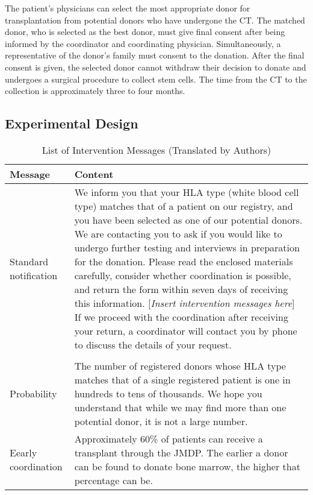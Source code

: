 \documentclass[12pt, a4paper]{article}
\begin{document}
The patient's physicians can select the most appropriate donor for transplantation from potential donors who have undergone the CT. The matched donor, who is selected as the best donor, must give final consent after being informed by the coordinator and coordinating physician. Simultaneously, a representative of the donor's family must consent to the donation. After the final consent is given, the selected donor cannot withdraw their decision to donate and undergoes a surgical procedure to collect stem cells. The time from the CT to the collection is approximately three to four months.

\hypertarget{design}{%
\subsection{Experimental Design}\label{design}}

\begin{table}

\caption{\label{tab:list-message}List of Intervention Messages (Translated by Authors)}
\centering
\fontsize{8}{10}\selectfont
\begin{tabular}[t]{l>{\raggedright\arraybackslash}p{40em}}
\toprule
Message & Content\\
\midrule
Standard notification & We inform you that your HLA type (white blood cell type) matches that of a patient on our registry, and you have been selected as one of our potential donors. We are contacting you to ask if you would like to undergo further testing and interviews in preparation for the donation. Please read the enclosed materials carefully, consider whether coordination is possible, and return the form within seven days of receiving this information. [\emph{Insert intervention messages here}] If we proceed with the coordination after receiving your return, a coordinator will contact you by phone to discuss the details of your request.\\
\addlinespace[0.3em]
\multicolumn{2}{l}{\textbf{Intervention message}}\\
\hspace{1em}Probability & The number of registered donors whose HLA type matches that of a single registered patient is one in hundreds to tens of thousands. We hope you understand that while we may find more than one potential donor, it is not a large number.\\
\hspace{1em}Eearly coordination & Approximately 60\% of patients can receive a transplant through the JMDP. The earlier a donor can be found to donate bone marrow, the higher that percentage can be.\\
\bottomrule
\end{tabular}
\end{table}
\end{document}

